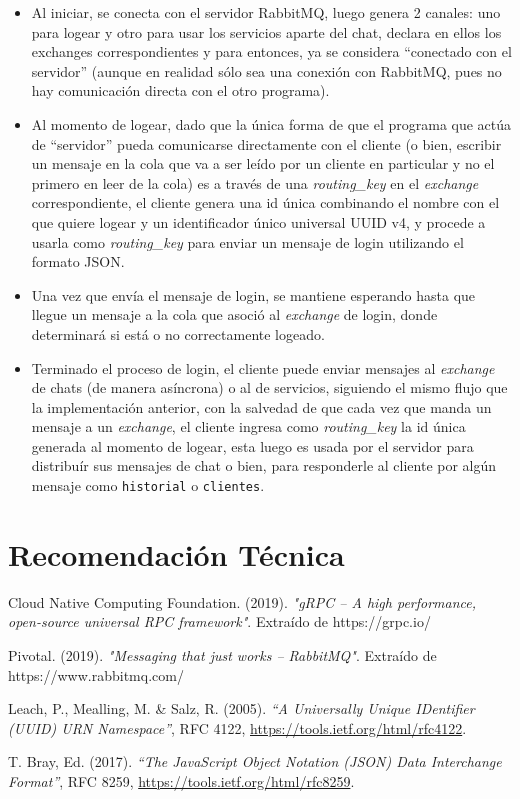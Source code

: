 \documentclass[11pt, letter]{article}
\begin{document}
\begin{itemize}
	\item Al iniciar, se conecta con el servidor RabbitMQ, luego genera 2 canales: uno para logear y otro para usar los servicios aparte del chat, declara en ellos los exchanges correspondientes y para entonces, ya se considera ``conectado con el servidor'' (aunque en realidad sólo sea una conexión con RabbitMQ, pues no hay comunicación directa con el otro programa).
	\item Al momento de logear, dado que la única forma de que el programa que actúa de ``servidor'' pueda comunicarse directamente con el cliente (o bien, escribir un mensaje en la cola que va a ser leído por un cliente en particular y no el primero en leer de la cola) es a través de una \textit{routing\_key} en el \textit{exchange} correspondiente, el cliente genera una id única combinando el nombre con el que quiere logear y un identificador único universal UUID v4\cite{RFC4122}, y procede a usarla como \textit{routing\_key} para enviar un mensaje de login utilizando el formato JSON\cite{RFC8259}.
	\item Una vez que envía el mensaje de login, se mantiene esperando hasta que llegue un mensaje a la cola que asoció al \textit{exchange} de login, donde determinará si está o no correctamente logeado.
	\item Terminado el proceso de login, el cliente puede enviar mensajes al \textit{exchange} de chats (de manera asíncrona) o al de servicios, siguiendo el mismo flujo que la implementación anterior, con la salvedad de que cada vez que manda un mensaje a un \textit{exchange}, el cliente ingresa como \textit{routing\_key} la id única generada al momento de logear, esta luego es usada por el servidor para distribuír sus mensajes de chat o bien, para responderle al cliente por algún mensaje como \texttt{historial} o \texttt{clientes}.
\end{itemize}

\section{Recomendación Técnica}



\begin{thebibliography}{99}
\raggedright

 Cloud Native Computing Foundation. (2019). \textit{"gRPC -- A high performance, open-source universal RPC framework"}. Extraído de https://grpc.io/

 Pivotal. (2019). \textit{"Messaging that just works -- RabbitMQ"}. Extraído de https://www.rabbitmq.com/

 Leach, P., Mealling, M. \& Salz, R. (2005). \textit{``A Universally Unique IDentifier (UUID) URN Namespace''}, RFC 4122, \url{https://tools.ietf.org/html/rfc4122}.

 T. Bray, Ed. (2017). \textit{``The JavaScript Object Notation (JSON) Data Interchange Format''}, RFC 8259, \url{https://tools.ietf.org/html/rfc8259}.

\end{thebibliography}
\end{document}
